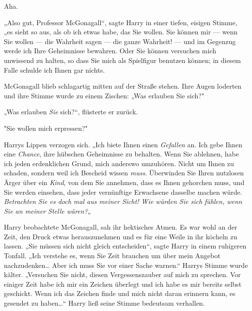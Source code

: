 {Aha.

„Also gut, Professor McGonagall“, sagte Harry in einer tiefen, eisigen Stimme, „es sieht so aus, als ob ich etwas habe, das Sie wollen. Sie können mir --- wenn Sie wollen --- die Wahrheit sagen --- die ganze Wahrheit! --- und im Gegenzug werde ich Ihre Geheimnisse bewahren. Oder Sie können versuchen mich unwissend zu halten, so dass Sie mich als Spielfigur benutzen können; in diesem Falle schulde ich Ihnen gar nichts.

McGonagall blieb schlagartig mitten auf der Straße stehen. Ihre Augen loderten und ihre Stimme wurde zu einem Zischen: „Was erlauben Sie sich?"

„Was erlauben \emph{Sie} sich?“, flüsterte er zurück.

"Sie wollen mich erpressen?"

Harrys Lippen verzogen sich. „Ich biete Ihnen einen \emph{Gefallen} an. Ich gebe Ihnen eine \emph{Chance}, ihre hübschen Geheimnisse zu behalten. Wenn Sie ablehnen, habe ich jeden erdenklichen Grund, mich anderswo umzuhören. Nicht um Ihnen zu schaden, sondern weil ich Bescheid wissen \emph{muss}. Überwinden Sie Ihren nutzlosen Ärger über ein \emph{Kind}, von dem Sie annehmen, dass es Ihnen gehorchen muss, und Sie werden einsehen, dass jeder vernünftige Erwachsene dasselbe machen würde. \emph{Betrachten Sie es doch mal aus meiner Sicht! Wie würden Sie sich fühlen, wenn Sie an meiner Stelle wären?}„

Harry beobachtete McGonagall, sah ihr hektisches Atmen. Es war wohl an der Zeit, den Druck etwas herauszunehmen und es für eine Weile in ihr köcheln zu lassen. „Sie müssen sich nicht gleich entscheiden“, sagte Harry in einem ruhigeren Tonfall. „Ich verstehe es, wenn Sie Zeit brauchen um über mein Angebot nachzudenken… Aber ich muss Sie vor einer Sache warnen.“ Harrys Stimme wurde kälter. „Versuchen Sie nicht, diesen Vergessenszauber auf mich zu sprechen. Vor einiger Zeit habe ich mir ein Zeichen überlegt und ich habe es mir bereits selbst geschickt. Wenn ich das Zeichen finde und mich nicht daran erinnern kann, es gesendet zu haben…“ Harry ließ seine Stimme bedeutsam verhallen.

}
